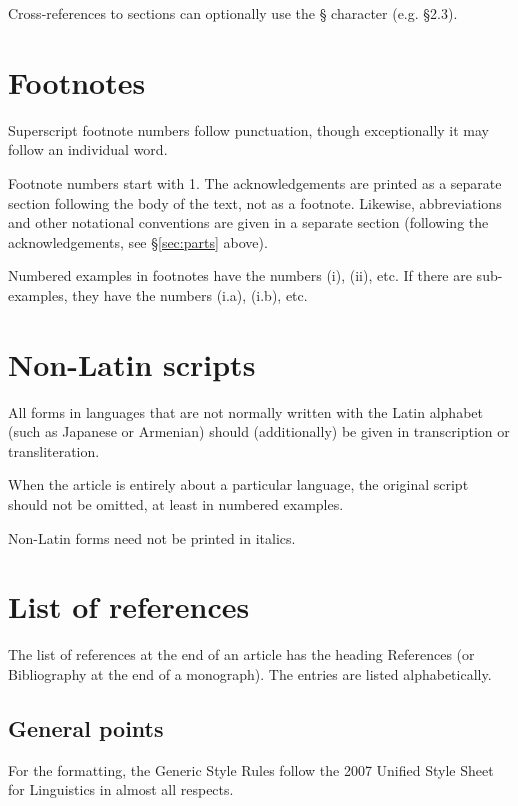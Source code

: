 \documentclass[a4paper]{article}
\newcommand{\gsrex}[1]{{\color{blue}#1}}
\newcommand{\sectref}[1]{\S\ref{#1}}
\begin{document}
Cross-references to sections can optionally use the \gsrex{§}
character (e.g. \gsrex{§2.3}).

\section{Footnotes}\label{sec:footnotes}

Superscript footnote numbers follow punctuation, though exceptionally it
may follow an individual word.

Footnote numbers start with \gsrex{1}. The
acknowledgements are printed as a separate section following the body of
the text, not as a footnote. Likewise, abbreviations and other
notational conventions are given in a separate section (following the
acknowledgements, see \sectref{sec:parts} above).

Numbered examples in footnotes have the
numbers \gsrex{(i)}, 
\gsrex{(ii)}, etc. If there are sub- examples, they have the
numbers \gsrex{(i.a)}, 
\gsrex{(i.b)}, etc.

\section{Non-Latin scripts}\label{sec:non-latin-scripts}

All forms in languages that are not normally written with the Latin
alphabet (such as Japanese or Armenian) should (additionally) be given
in transcription or transliteration.

When the article is entirely about
a particular language, the original script should not be omitted, at
least in numbered examples. 

Non-Latin forms need not be printed in
italics.

\section{List of references}\label{sec:listofreferences}

The list of references at the end of an article has the heading
\gsrex{References} (or \gsrex{Bibliography} at the end of a monograph). The entries are
listed alphabetically.

\subsection{General points}\label{sec:general-points}

For the formatting, the Generic Style Rules follow the 2007 Unified
Style Sheet for Linguistics in almost all respects. 
\end{document}
